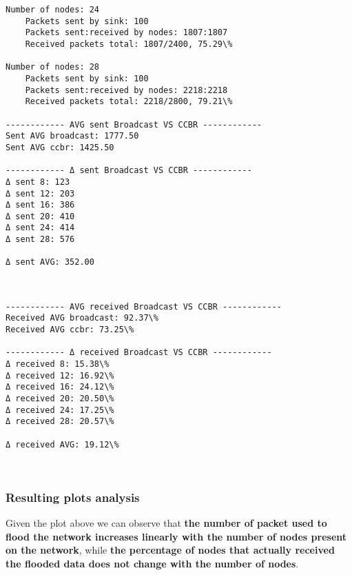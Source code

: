 \documentclass[11pt]{article}
\begin{document}
\begin{Verbatim}[commandchars=\\\{\}]
Number of nodes: 24
	Packets sent by sink: 100
	Packets sent:received by nodes: 1807:1807
	Received packets total: 1807/2400, 75.29\%

Number of nodes: 28
	Packets sent by sink: 100
	Packets sent:received by nodes: 2218:2218
	Received packets total: 2218/2800, 79.21\%

------------ AVG sent Broadcast VS CCBR ------------
Sent AVG broadcast: 1777.50
Sent AVG ccbr: 1425.50

------------ Δ sent Broadcast VS CCBR ------------
Δ sent 8: 123
Δ sent 12: 203
Δ sent 16: 386
Δ sent 20: 410
Δ sent 24: 414
Δ sent 28: 576

Δ sent AVG: 352.00

    \end{Verbatim}

    \begin{center}
    \end{center}
    { \hspace*{\fill} \\}
    
    \begin{Verbatim}[commandchars=\\\{\}]
------------ AVG received Broadcast VS CCBR ------------
Received AVG broadcast: 92.37\%
Received AVG ccbr: 73.25\%

------------ Δ received Broadcast VS CCBR ------------
Δ received 8: 15.38\%
Δ received 12: 16.92\%
Δ received 16: 24.12\%
Δ received 20: 20.50\%
Δ received 24: 17.25\%
Δ received 28: 20.57\%

Δ received AVG: 19.12\%

    \end{Verbatim}

    \begin{center}
    \end{center}
    { \hspace*{\fill} \\}
    
    \hypertarget{resulting-plots-analysis}{%
\subsubsection{Resulting plots
analysis}\label{resulting-plots-analysis}}

Given the plot above we can observe that \textbf{the number of packet
used to flood the network increases linearly with the number of nodes
present on the network}, while \textbf{the percentage of nodes that
actually received the flooded data does not change with the number of
nodes}.
\end{document}
